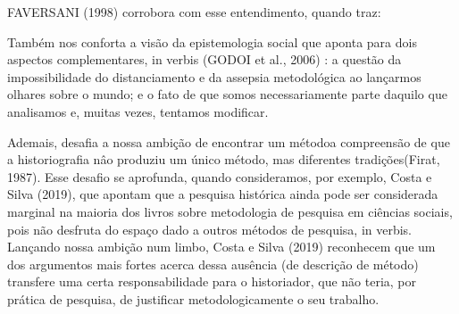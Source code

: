 \documentclass[
12pt,		%
openright,	%
twoside,  %
a4paper,			%
chapter=TITLE,		%
english,			%
french,				%
spanish,			%
brazil				%
]{USPSC-classe/USPSC}
\begin{document}
 FAVERSANI (1998) corrobora com esse entendimento, quando traz:


















\noindent\begin{center}\mbox{\centering{}}\end{center}


Tamb\'em nos conforta a vis\~ao da epistemologia social que aponta para dois aspectos complementares, in verbis  (GODOI et al., 2006) : \textquotedbl a quest\~ao da impossibilidade do distanciamento e da assepsia metodol\'ogica ao lan\c{c}armos olhares sobre o mundo; e o fato de que somos necessariamente parte daquilo que analisamos e, muitas vezes, tentamos modificar\textquotedbl .

















Ademais, desafia a nossa ambi\c{c}\~ao de \textquotedbl encontrar um m\'etodo\textquotedbl  a compreens\~ao de que a \textquotedbl historiografia n\^ao produziu um \'unico m\'etodo, mas diferentes tradi\c{c}\~oes\textquotedbl   (Firat, 1987).  Esse desafio se aprofunda, quando consideramos, por exemplo, Costa e Silva (2019), que apontam que a \textquotedbl pesquisa hist\'orica ainda pode ser considerada marginal na maioria dos livros sobre metodologia de pesquisa em ci\^encias sociais, pois n\~ao desfruta do espa\c{c}o dado a outros m\'etodos de pesquisa\textquotedbl , in verbis. Lan\c{c}ando nossa ambi\c{c}\~ao num limbo,  Costa e Silva (2019) reconhecem \textquotedbl que um dos argumentos mais fortes acerca dessa aus\^encia (de descri\c{c}\~ao de m\'etodo) transfere uma certa responsabilidade para o historiador, que n\~ao teria, por pr\'atica de pesquisa, de justificar metodologicamente o seu trabalho\textquotedbl .
\end{document}
